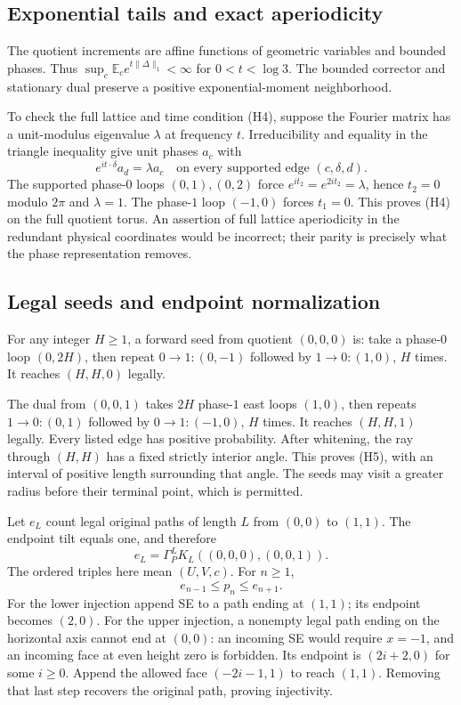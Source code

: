 \documentclass[11pt,letterpaper]{article}
\numberwithin{equation}{section}
\theoremstyle{remark}\newtheorem{remark}[theorem]{Remark}
\newcommand{\EE}{\mathbb E}
\newcommand{\gp}{\Gamma_P}\newcommand{\gs}{\Gamma_S}
\begin{document}
\subsection{Exponential tails and exact aperiodicity}
The quotient increments are affine functions of geometric variables
and bounded phases. Thus $\sup_c\EE_c e^{t\|\Delta\|_1}<\infty$ for
$0<t<\log3$. The bounded corrector and stationary dual preserve a
positive exponential-moment neighborhood.

To check the full lattice and time condition (H4), suppose the Fourier
matrix has a unit-modulus eigenvalue $\lambda$ at frequency $t$.
Irreducibility and equality in the triangle inequality give unit
phases $a_c$ with
\begin{equation}\label{cps:log:eq:phase-equality}
 e^{it\cdot\delta}a_d=\lambda a_c
 \quad\text{on every supported edge }(c,\delta,d).
\end{equation}
The supported phase-$0$ loops $(0,1),(0,2)$ force
$e^{it_2}=e^{2it_2}=\lambda$, hence $t_2=0$ modulo $2\pi$ and
$\lambda=1$. The phase-$1$ loop $(-1,0)$ forces $t_1=0$.
This proves (H4) on the full quotient torus. An assertion of full
lattice aperiodicity in the redundant physical coordinates would be
incorrect; their parity is precisely what the phase representation
removes.

\subsection{Legal seeds and endpoint normalization}
For any integer $H\ge1$, a forward seed from quotient $(0,0,0)$ is:
take a phase-$0$ loop $(0,2H)$, then repeat
$0\to1:(0,-1)$ followed by $1\to0:(1,0)$, $H$ times. It reaches
$(H,H,0)$ legally.

The dual from $(0,0,1)$ takes $2H$ phase-$1$ east loops $(1,0)$,
then repeats $1\to0:(0,1)$ followed by $0\to1:(-1,0)$, $H$ times.
It reaches $(H,H,1)$ legally. Every listed edge has positive
probability. After whitening, the ray through $(H,H)$ has a fixed
strictly interior angle. This proves (H5), with an interval of positive
length surrounding that angle. The seeds may visit a greater radius
before their terminal point, which is permitted.

Let $e_L$ count legal original paths of length $L$ from $(0,0)$ to
$(1,1)$. The endpoint tilt equals one, and therefore
\begin{equation}\label{cps:log:eq:Pendpoint}
 e_L=\gp^L K_L((0,0,0),(0,0,1)).
\end{equation}
The ordered triples here mean $(U,V,c)$. For $n\ge1$,
\begin{equation}\label{cps:log:eq:Psandwich}
 e_{n-1}\le p_n\le e_{n+1}.
\end{equation}
For the lower injection append SE to a path ending at $(1,1)$;
its endpoint becomes $(2,0)$. For the upper injection, a nonempty
legal path ending on the horizontal axis cannot end at $(0,0)$:
an incoming SE would require $x=-1$, and an incoming face at even
height zero is forbidden. Its endpoint is $(2i+2,0)$ for some $i\ge0$.
Append the allowed face $(-2i-1,1)$ to reach $(1,1)$. Removing that
last step recovers the original path, proving injectivity.
\end{document}
